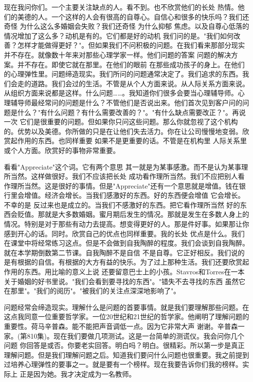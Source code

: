 现在我问你们。一个主要关注缺点的人。看不到。也不欣赏他们的长处 热情。他们的美德的人。一个这样的人会有很高的自尊心。自信心和很多的快乐吗？我们还奇怪 为什么这么多婚姻会失败？我们还奇怪 为什么抑郁 焦虑。以及自尊心低落的情况增加了这么多？动机是有的。它们都是好的动机 我们问的是。"我们如何改善？怎样才能做得更好？"。但如果我们不问积极的问题。在我们看来那部分现实并不存在。就像数十年来对那些心理学家一样。他们问题的答案 问题的解决方案。并不存在。即使它就在那里。在他们的眼前 在那些成功孩子的身上。在他们的心理弹性里。问题缔造现实。我们所问的问题通常决定了。我们追求的东西。我们会走的道路。我们会过的生活。不管是从个人方面来说。从人际关系方面来说。从组织方面来说都是这样。什么问题……。我知道你们很多会要当心理辅导师。心理辅导师最经常问的问题是什么？不管他们是否说出来。他们首次见到客户问的问题是什么？"有什么问题？有什么需要改善的？"。"有什么缺点需要改正？"。再说一次 它们是很重要的问题。但如果你只问这些问题。那么你就忽视了这个机构的。优势以及美德。你所做的只是在让他们失去活力。你在让公司慢慢地变弱。欣赏起作用的东西。也同样重要 如果不是更重要的话。不管是在机构里 人际关系里或个人方面。欣赏好的事物非常重要。 

看看"Appreciate"这个词。它有两个意思 其一就是为某事感激。而不是认为某事理所当然。这样做很好。我们不应该把长处 成功看作理所当然。我们不应把别人看作理所当然。这是很好的事情。但是"Appreciate"还有一个意思就是增值。钱在银行里会增值。经济会增长。当我们感激好的东西。好的东西便会增值 它会增长。不幸的是 反过来也是成立的。当我们不感激好的东西。把它看作理所当然 好的东西会贬值。那就是大多数婚姻。蜜月期后发生的情况。那就是发生在多数人身上的情况。特别是对于那些有动力去提高。想变得更好的人。那是件好事。如果那让你感到开心的话。同时。欣赏自己的优点也同样重要。我的长处 优点是什么。我们在课堂中将经常练习这点。但是不会做到自我陶醉的程度。我们会谈到自我陶醉。就在本学期倒数第二节课。自我陶醉不是自信 不是自尊。它正好相反。我们说的是有根据的自信。有根据的大方有益的快乐。为了过上那种生活。我们还要欣赏起作用的东西。用比喻的意义上说 还要留意巴士上的小孩。Stavros和Torres在一本关于婚姻的好书里说。"我们会看到要寻找的东西"。"错失不去寻找的东西 虽然它在那里"。"我们的阅历"。"被我们的关注点深深地影响了"。 

问题经常会缔造现实。理解什么是问题的首要事情。就是我们要理解那些问题。在这点我同意一位重要哲学家。一位20世纪和21世纪的哲学家。他阐明了理解问题的重要性。荷马辛普森。能不能把声音调低一点。因为它非常大声 谢谢。辛普森一家。(第810集)。现在我们要做几项测试。这是一台简单的测谎仪。我会问你几个问题 你回答是或否。你要老实回答。明白吗？明白。很精彩。所以第一步是真正理解问题。但是我们理解问题之后。知道我们要问什么问题也很重要。我之前提到过培养心理弹性的要事之一。就是要有一个榜样。现在我要告诉你们我的榜样。实际上 正是因为她。我才决定成为一名教师。 

